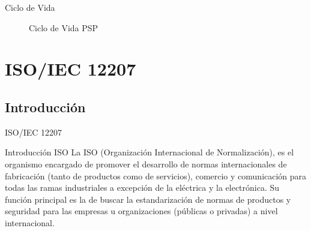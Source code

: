 \documentclass{beamer}
\begin{document}
			\begin{frame}{Ciclo de Vida}
				\begin{figure}								
					 \caption{Ciclo de Vida PSP}
				\end{figure}			
			\end{frame}						
			
\section{ISO/IEC 12207}
		\subsection{Introducci\'on}
		
			\begin{frame}
				\begin{center}
					\begin{block}{}
						\begin{center}
							{\huge ISO/IEC 12207}
						\end{center}
					\end{block}
				\end{center}
			\end{frame}					
		
			\begin{frame}{Introducci\'on ISO}
				La ISO (Organización Internacional de Normalización), es el organismo encargado de promover el desarrollo de normas internacionales de fabricación (tanto de productos como de servicios), comercio y comunicación para todas las ramas industriales a excepción de la eléctrica y la electrónica. Su función principal es la de buscar la estandarización de normas de productos y seguridad para las empresas u organizaciones (públicas o privadas) a nivel internacional.\\ \smallskip
			\end{frame}
		
\end{document}
